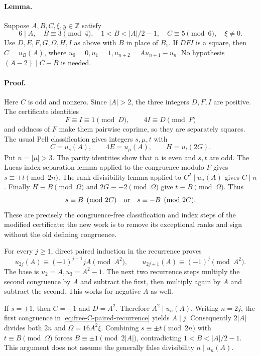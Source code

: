 \paragraph{Lemma.}
Suppose $A,B,C,\xi,y\in\mathbb Z$ satisfy
\[
 6\mid A,\quad B\equiv3\pmod4,\quad
 1<B<|A|/2-1,\quad C\equiv5\pmod6,\quad\xi\ne0.
\]
Use $D,E,F,G,\Omega,H,I$ as above with $B$ in place of $B_1$.
If $DFI$ is a square, then $C=u_B(A)$, where
$u_0=0,u_1=1,u_{n+2}=Au_{n+1}-u_n$.
No hypothesis $(A-2)\mid C-B$ is needed.

\paragraph{Proof.}
Here $C$ is odd and nonzero. Since $|A|>2$, the three integers $D,F,I$
are positive. The certificate identities
\[
 F\equiv I\equiv1\pmod D,\qquad 4I\equiv D\pmod F
\]
and oddness of $F$ make them pairwise coprime, so they are separately
squares. The usual Pell classification gives integers $s,\mu,t$ with
\[
 C=u_s(A),\qquad 4E=u_\mu(A),\qquad H=u_t(2G).
\]
Put $n=|\mu|>3$. The parity identities show that $n$ is even and $s,t$
are odd. The Lucas index-separation lemma applied to the congruence modulo
$F$ gives $s\equiv\pm t\pmod{2n}$. The rank-divisibility lemma applied
to $C^2\mid u_n(A)$ gives $C\mid n$. Finally $H\equiv B\pmod\Omega$
and $2G\equiv-2\pmod\Omega$ give $t\equiv B\pmod\Omega$.
Thus
\begin{equation}\label{eq:free-C-rank-residue}
 s\equiv B\pmod{2C}\quad\hbox{or}\quad s\equiv-B\pmod{2C}.
\end{equation}
These are precisely the congruence-free classification and index steps of
the modified certificate; the new work is to remove its exceptional ranks
and sign without the old defining congruence.

For every $j\ge1$, direct paired induction in the recurrence proves
\begin{equation}\label{eq:free-C-paired-recurrence}
 u_{2j}(A)\equiv(-1)^{j-1}jA\pmod{A^2},\qquad
 u_{2j+1}(A)\equiv(-1)^j\pmod{A^2}.
\end{equation}
The base is $u_2=A,u_3=A^2-1$. The next two recurrence steps multiply the
second congruence by $A$ and subtract the first, then multiply again by $A$
and subtract the second. This works for negative $A$ as well.

If $s=\pm1$, then $C=\pm1$ and $D=A^2$. Therefore $A^2\mid u_n(A)$.
Writing $n=2j$, the first congruence in
\eqref{eq:free-C-paired-recurrence} yields $A\mid j$.
Consequently $2|A|$ divides both $2n$ and
$\Omega=16A^2\xi$. Combining $s\equiv\pm t\pmod{2n}$ with
$t\equiv B\pmod\Omega$ forces $B\equiv\pm1\pmod{2|A|}$,
contradicting $1<B<|A|/2-1$.
This argument does not assume the generally false divisibility $n\mid u_n(A)$.

